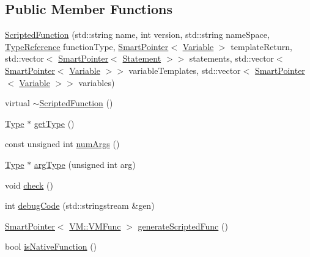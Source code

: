 \subsection*{Public Member Functions}
\begin{DoxyCompactItemize}
\item 
\hyperlink{class_scribble_core_1_1_scripted_function_abbf5f1e50cac1e11b2882ae4f0c38878}{Scripted\-Function} (std\-::string name, int version, std\-::string name\-Space, \hyperlink{namespace_scribble_core_a0e685a305b14aa5f0504df1369ba270b}{Type\-Reference} function\-Type, \hyperlink{_smart_pointer_8hpp_afdd8d4ba81c3fcbdeacf1dafba2accfb}{Smart\-Pointer}$<$ \hyperlink{class_scribble_core_1_1_variable}{Variable} $>$ template\-Return, std\-::vector$<$ \hyperlink{_smart_pointer_8hpp_afdd8d4ba81c3fcbdeacf1dafba2accfb}{Smart\-Pointer}$<$ \hyperlink{class_scribble_core_1_1_statement}{Statement} $>$$>$ statements, std\-::vector$<$ \hyperlink{_smart_pointer_8hpp_afdd8d4ba81c3fcbdeacf1dafba2accfb}{Smart\-Pointer}$<$ \hyperlink{class_scribble_core_1_1_variable}{Variable} $>$$>$ variable\-Templates, std\-::vector$<$ \hyperlink{_smart_pointer_8hpp_afdd8d4ba81c3fcbdeacf1dafba2accfb}{Smart\-Pointer}$<$ \hyperlink{class_scribble_core_1_1_variable}{Variable} $>$$>$ variables)
\item 
virtual \hyperlink{class_scribble_core_1_1_scripted_function_aaef60d0ec474921e827eec6fa0cbc34d}{$\sim$\-Scripted\-Function} ()
\item 
\hyperlink{class_scribble_core_1_1_type}{Type} $\ast$ \hyperlink{class_scribble_core_1_1_scripted_function_a17fdb48f024f25d425c55a4ee0aff5a3}{get\-Type} ()
\item 
const unsigned int \hyperlink{class_scribble_core_1_1_scripted_function_a43340a1cf723f2862124eef8d92039f7}{num\-Args} ()
\item 
\hyperlink{class_scribble_core_1_1_type}{Type} $\ast$ \hyperlink{class_scribble_core_1_1_scripted_function_a78f81df4187093a5e7bc94c6d57fd11e}{arg\-Type} (unsigned int arg)
\item 
void \hyperlink{class_scribble_core_1_1_scripted_function_ae527084185cc034975bf61ec23c57ba9}{check} ()
\item 
int \hyperlink{class_scribble_core_1_1_scripted_function_a7e5968b233124279a9a9ff4a6706bd41}{debug\-Code} (std\-::stringstream \&gen)
\item 
\hyperlink{_smart_pointer_8hpp_afdd8d4ba81c3fcbdeacf1dafba2accfb}{Smart\-Pointer}$<$ \hyperlink{class_v_m_1_1_v_m_func}{V\-M\-::\-V\-M\-Func} $>$ \hyperlink{class_scribble_core_1_1_scripted_function_a80265e1d31e9e767fca0e365846251d4}{generate\-Scripted\-Func} ()
\item 
bool \hyperlink{class_scribble_core_1_1_scripted_function_a05fccc0cfe86d5efa8a19f7e5c3f6da0}{is\-Native\-Function} ()
\end{DoxyCompactItemize}
